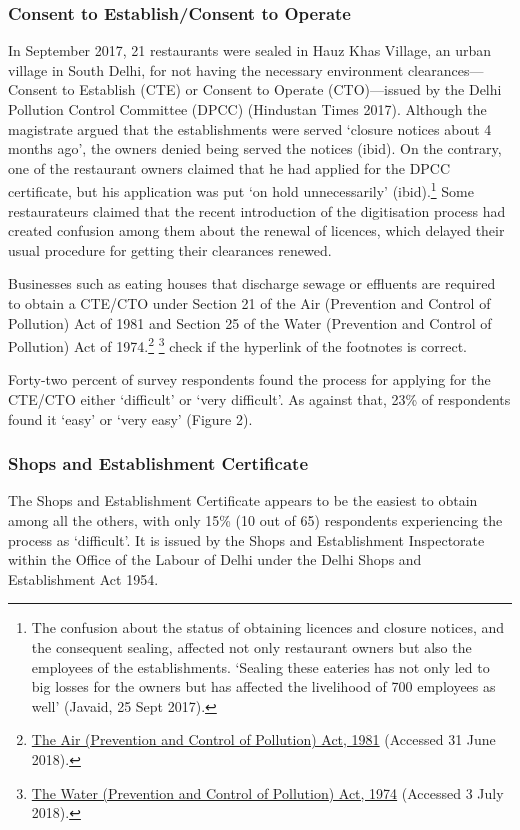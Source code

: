 \documentclass[a4paper, 12pt]{article}
\begin{document}
                   \subsubsection{Consent to Establish/Consent to Operate}
                   In September 2017, 21 restaurants were sealed in Hauz Khas Village, an urban village in South Delhi, for not having the necessary environment clearances—Consent to Establish (CTE) or Consent to Operate (CTO)—issued by the Delhi Pollution 
Control Committee (DPCC) (Hindustan Times 2017). Although the magistrate argued that the establishments were served ‘closure notices about 4 months ago’, the owners denied being served the notices (ibid). On the contrary, one of the restaurant owners 
claimed that he had applied for the DPCC certificate, but his application was put ‘on hold unnecessarily’ (ibid).\footnote{The confusion about the status of obtaining licences and closure notices, and the consequent sealing, affected not only restaurant owners but 
also the employees of the establishments. ‘Sealing these eateries has not only led to big losses for the owners but has affected the livelihood of 700 employees as well’ (Javaid, 25 Sept 2017).} Some restaurateurs claimed that the recent introduction of the 
digitisation process had created confusion among them about the renewal of licences, which delayed their usual procedure for getting their clearances renewed.%
                   
                   Businesses such as eating houses that discharge sewage or effluents are required to obtain a CTE/CTO under Section 21 of the Air (Prevention and Control of Pollution) Act of 1981 and Section 25 of the Water (Prevention and Control of Pollution) Act 
of 1974.\footnote{\href{https://bit.ly/2pbaWOw}{The Air (Prevention and Control of Pollution) Act, 1981} (Accessed 31 June 2018).} \footnote{\href{https://bit.ly/2xcUyRW}{The Water (Prevention and Control of Pollution) Act, 1974} (Accessed 3 July 2018).}  %
check if the hyperlink of the footnotes is correct. 
                   
                   Forty-two percent of survey respondents found the process for applying for the CTE/CTO either ‘difficult’ or ‘very difficult’. As against that, 23\% of respondents found it ‘easy’ or ‘very easy’ (Figure 2).
              
                   \subsubsection{Shops and Establishment Certificate}
                   The Shops and Establishment Certificate appears to be the easiest to obtain among all the others, with only 15\% (10 out of 65) respondents experiencing the process as ‘difficult’. It is issued by the Shops and Establishment Inspectorate within the 
Office of the Labour of Delhi under the Delhi Shops and Establishment Act 1954.
                   
\end{document}
